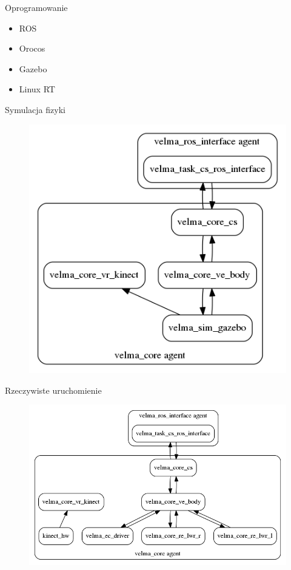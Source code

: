 \documentclass{beamer}
\begin{document}
\begin{frame}{Oprogramowanie}
\begin{itemize}
	\item ROS
	\item Orocos
	\item Gazebo
	\item Linux RT
\end{itemize}
\end{frame}

\begin{frame}{Symulacja fizyki}
\begin{figure}
	\centering
	\includegraphics[scale=0.4]{simulation}
\end{figure}
\end{frame}

\begin{frame}{Rzeczywiste uruchomienie}
\begin{figure}
\centering
\includegraphics[scale=0.4]{real}
\end{figure}
\end{frame}
\end{document}
